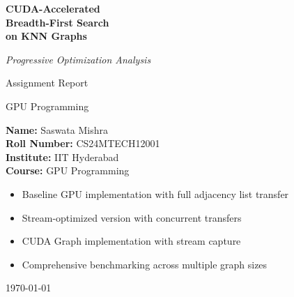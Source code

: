 \documentclass[11pt,a4paper]{article}
\begin{document}
\begin{titlepage}
    \centering
    \vspace*{2cm}
    
    {\Huge\bfseries CUDA-Accelerated\\[0.5cm] Breadth-First Search\\[0.5cm] on KNN Graphs\par}
    \vspace{1.5cm}
    
    {\Large\itshape Progressive Optimization Analysis\par}
    \vspace{2cm}
    
    {\large Assignment Report\par}
    \vspace{0.5cm}
    {\large GPU Programming\par}
    \vspace{1.5cm}
    
    \begin{tcolorbox}[colback=blue!10!white,colframe=blue!75!black,width=0.7\textwidth]
        \centering
        \textbf{Name:} Saswata Mishra\\[0.3cm]
        \textbf{Roll Number:} CS24MTECH12001\\[0.3cm]
        \textbf{Institute:} IIT Hyderabad\\[0.3cm]
        \textbf{Course:} GPU Programming
    \end{tcolorbox}
    
    \vspace{1cm}
    
    \begin{tcolorbox}[colback=blue!5!white,colframe=blue!75!black,title=Implementation Highlights]
        \begin{itemize}
            \item Baseline GPU implementation with full adjacency list transfer
            \item Stream-optimized version with concurrent transfers
            \item CUDA Graph implementation with stream capture
            \item Comprehensive benchmarking across multiple graph sizes
        \end{itemize}
    \end{tcolorbox}
    
    \vfill
    {\large \today\par}
\end{titlepage}
\end{document}
